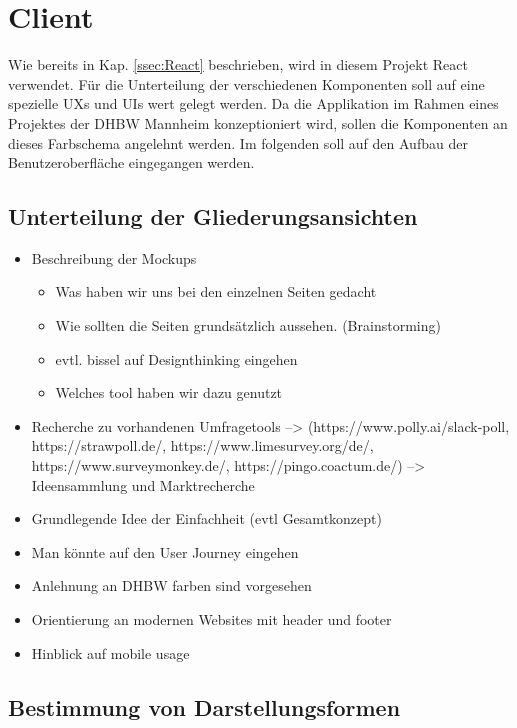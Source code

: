 \section{Client}
\label{sec:ClientKonzept}
\authorsection{\authorSG}

Wie bereits in Kap. \vref{ssec:React} beschrieben, wird in diesem Projekt React verwendet. 
Für die Unterteilung der verschiedenen Komponenten soll auf eine spezielle \acfp{UX} und \acfp{UI} wert gelegt werden. 
Da die Applikation im Rahmen eines Projektes der DHBW Mannheim konzeptioniert wird, sollen die Komponenten an dieses Farbschema angelehnt werden. 
Im folgenden soll auf den Aufbau der Benutzeroberfläche eingegangen werden. 











\subsection{Unterteilung der Gliederungsansichten}

\begin{itemize}
	\item Beschreibung der Mockups 
	 \begin{itemize}
		 \item Was haben wir uns bei den einzelnen Seiten gedacht
		 \item Wie sollten die Seiten grundsätzlich aussehen. (Brainstorming)
		 \item evtl. bissel auf Designthinking eingehen
		 \item Welches tool haben wir dazu genutzt
	 \end{itemize}
	 \item Recherche zu vorhandenen Umfragetools --> (https://www.polly.ai/slack-poll, https://strawpoll.de/, https://www.limesurvey.org/de/, https://www.surveymonkey.de/, https://pingo.coactum.de/)
	 --> Ideensammlung und Marktrecherche
	 \item Grundlegende Idee der Einfachheit (evtl Gesamtkonzept)
	 \item Man könnte auf den User Journey eingehen
	 \item Anlehnung an DHBW farben sind vorgesehen
	 \item Orientierung an modernen Websites mit header und footer
	 \item Hinblick auf mobile usage
\end{itemize}

\subsection{Bestimmung von Darstellungsformen}